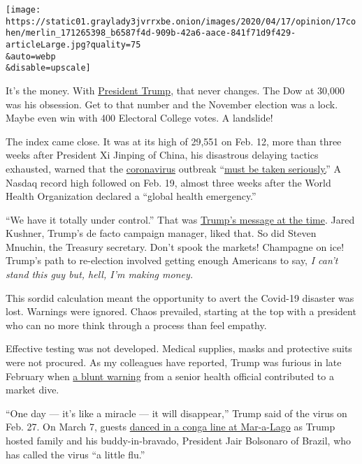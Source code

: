 \texttt{[image: https://static01.graylady3jvrrxbe.onion/images/2020/04/17/opinion/17cohen/merlin\_171265398\_b6587f4d-909b-42a6-aace-841f71d9f429-articleLarge.jpg?quality=75\\\&auto=webp\\\&disable=upscale]}

It's the money. With
\href{https://www.nytimes3xbfgragh.onion/2020/05/07/us/politics/trump-coronavirus-fact-check.html}{President
Trump}, that never changes. The Dow at 30,000 was his obsession. Get to
that number and the November election was a lock. Maybe even win with
400 Electoral College votes. A landslide!

The index came close. It was at its high of 29,551 on Feb. 12, more than
three weeks after President Xi Jinping of China, his disastrous delaying
tactics exhausted, warned that the
\href{https://www.nytimes3xbfgragh.onion/2020/05/07/us/politics/trump-coronavirus-fact-check.html}{coronavirus}
outbreak
``\href{https://apnews.com/14d7dcffa205d9022fa9ea593bb2a8c5}{must be
taken seriously.}'' A Nasdaq record high followed on Feb. 19, almost
three weeks after the World Health Organization declared a ``global
health emergency.''

``We have it totally under control.'' That was
\href{https://www.nytimes3xbfgragh.onion/2020/03/17/us/politics/trump-coronavirus.html}{Trump's
message at the time}. Jared Kushner, Trump's de facto campaign manager,
liked that. So did Steven Mnuchin, the Treasury secretary. Don't spook
the markets! Champagne on ice! Trump's path to re-election involved
getting enough Americans to say, \emph{I can't stand this guy but, hell,
I'm making money.}

This sordid calculation meant the opportunity to avert the Covid-19
disaster was lost. Warnings were ignored. Chaos prevailed, starting at
the top with a president who can no more think through a process than
feel empathy.

Effective testing was not developed. Medical supplies, masks and
protective suits were not procured. As my colleagues have reported,
Trump was furious in late February when
\href{https://www.nytimes3xbfgragh.onion/2020/04/11/us/politics/coronavirus-trump-response.html}{a
blunt warning} from a senior health official contributed to a market
dive.

``One day --- it's like a miracle --- it will disappear,'' Trump said of
the virus on Feb. 27. On March 7, guests
\href{https://www.nytimes3xbfgragh.onion/2020/03/14/us/politics/trump-coronavirus-mar-a-lago.html}{danced
in a conga line at Mar-a-Lago} as Trump hosted family and his
buddy-in-bravado, President Jair Bolsonaro of Brazil, who has called the
virus ``a little flu.''

